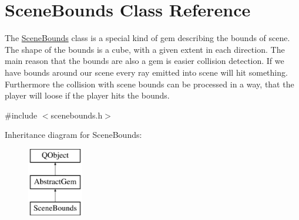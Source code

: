 \hypertarget{class_scene_bounds}{}\section{Scene\+Bounds Class Reference}
\label{class_scene_bounds}


The \hyperlink{class_scene_bounds}{Scene\+Bounds} class is a special kind of gem describing the bounds of scene. The shape of the bounds is a cube, with a given extent in each direction.  The main reason that the bounds are also a gem is easier collision detection. If we have bounds around our scene every ray emitted into scene will hit something. Furthermore the collision with scene bounds can be processed in a way, that the player will loose if the player hits the bounds.  




{\ttfamily \#include $<$scenebounds.\+h$>$}

Inheritance diagram for Scene\+Bounds\+:\begin{figure}[H]
\begin{center}
\leavevmode
\includegraphics[height=3.000000cm]{class_scene_bounds}
\end{center}
\end{figure}
